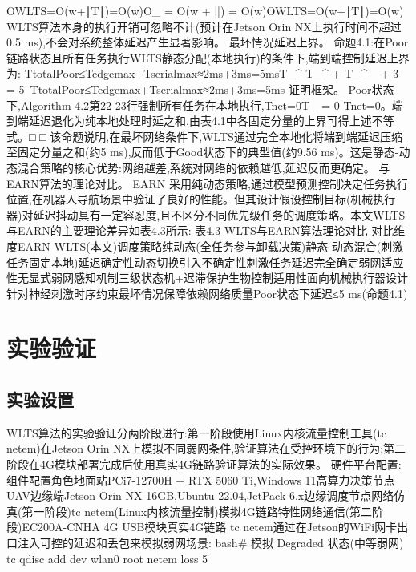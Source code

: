 OWLTS=O(w+∣T∣)=O(w)O_{} = O(w + ||) = O(w)OWLTS​=O(w+∣T∣)=O(w)
WLTS算法本身的执行开销可忽略不计(预计在Jetson Orin NX上执行时间不超过0.5 ms),不会对系统整体延迟产生显著影响。
最坏情况延迟上界。
命题4.1:在Poor链路状态且所有任务执行WLTS静态分配(本地执行)的条件下,端到端控制延迟上界为:
TtotalPoor≤Tedgemax⁡+Tserialmax⁡≈2ms+3ms=5msT_{}^{} \leq T_{}^{\max} + T_{}^{\max} \  + 3\  = 5\ TtotalPoor​≤Tedgemax​+Tserialmax​≈2ms+3ms=5ms
证明框架。 Poor状态下,Algorithm 4.2第22-23行强制所有任务在本地执行,Tnet=0T_{} = 0
Tnet​=0。端到端延迟退化为纯本地处理时延之和,由表4.1中各固定分量的上界可得上述不等式。□\square
□
该命题说明,在最坏网络条件下,WLTS通过完全本地化将端到端延迟压缩至固定分量之和(约5 ms),反而低于Good状态下的典型值(约9.56 ms)。这是静态-动态混合策略的核心优势:网络越差,系统对网络的依赖越低,延迟反而更确定。
与EARN算法的理论对比。 EARN \cite{li2025earn}采用纯动态策略,通过模型预测控制决定任务执行位置,在机器人导航场景中验证了良好的性能。但其设计假设控制目标(机械执行器)对延迟抖动具有一定容忍度,且不区分不同优先级任务的调度策略。本文WLTS与EARN的主要理论差异如表4.3所示:
表4.3 WLTS与EARN算法理论对比
对比维度EARN \cite{li2025earn}WLTS(本文)调度策略纯动态(全任务参与卸载决策)静态-动态混合(刺激任务固定本地)延迟确定性动态切换引入不确定性刺激任务延迟完全确定弱网适应性无显式弱网感知机制三级状态机+迟滞保护生物控制适用性面向机械执行器设计针对神经刺激时序约束最坏情况保障依赖网络质量Poor状态下延迟≤5 ms(命题4.1)

\section{实验验证}
\subsection{实验设置}

WLTS算法的实验验证分两阶段进行:第一阶段使用Linux内核流量控制工具(tc netem)在Jetson Orin NX上模拟不同弱网条件,验证算法在受控环境下的行为;第二阶段在4G模块部署完成后使用真实4G链路验证算法的实际效果。
硬件平台配置:
组件配置角色地面站PCi7-12700H + RTX 5060 Ti,Windows 11高算力决策节点UAV边缘端Jetson Orin NX 16GB,Ubuntu 22.04,JetPack 6.x边缘调度节点网络仿真(第一阶段)tc netem(Linux内核流量控制)模拟4G链路特性网络通信(第二阶段)EC200A-CNHA 4G USB模块真实4G链路
tc netem通过在Jetson的WiFi网卡出口注入可控的延迟和丢包来模拟弱网场景:
bash# 模拟 Degraded 状态(中等弱网)
tc qdisc add dev wlan0 root netem loss 5%

